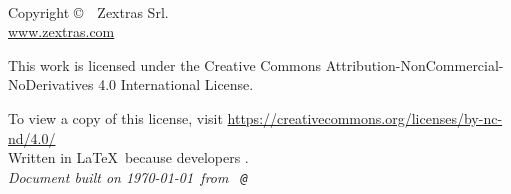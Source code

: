
\newpage
~\vfill
\thispagestyle{empty}

Copyright \copyright\ \the\year\ Zextras Srl.\\ %

\url{www.zextras.com}\\ %

\ccbyncsa{}

This work is licensed under the Creative Commons Attribution-NonCommercial-NoDerivatives 4.0 International License.

To view a copy of this license, visit \url{https://creativecommons.org/licenses/by-nc-nd/4.0/}\\

Written in \LaTeX\ because developers \ExcuseToUseLatex.\\

\textit{Document built on \today\ from \texttt{\branchName\ @\href{https://github.com/ZeXtras/ZimbraDrive/tree/\commitId}{\shortCommitId}}} %
